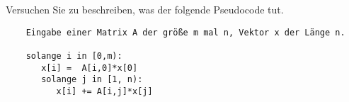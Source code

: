 Versuchen Sie zu beschreiben, was der folgende Pseudocode tut.
\begin{verbatim}
	Eingabe einer Matrix A der größe m mal n, Vektor x der Länge n.	
	
	solange i in [0,m):
	   x[i] =  A[i,0]*x[0]
	   solange j in [1, n):
	      x[i] += A[i,j]*x[j]
\end{verbatim}


